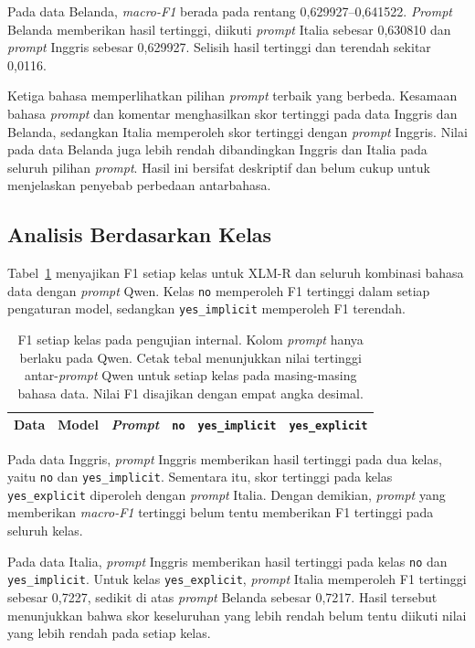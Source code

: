 \documentclass[11pt]{article}
\begin{document}
Pada data Belanda, \textit{macro-F1} berada pada rentang 0,629927--0,641522. \textit{Prompt} Belanda memberikan hasil tertinggi, diikuti \textit{prompt} Italia sebesar 0,630810 dan \textit{prompt} Inggris sebesar 0,629927. Selisih hasil tertinggi dan terendah sekitar 0,0116.

Ketiga bahasa memperlihatkan pilihan \textit{prompt} terbaik yang berbeda. Kesamaan bahasa \textit{prompt} dan komentar menghasilkan skor tertinggi pada data Inggris dan Belanda, sedangkan Italia memperoleh skor tertinggi dengan \textit{prompt} Inggris. Nilai pada data Belanda juga lebih rendah dibandingkan Inggris dan Italia pada seluruh pilihan \textit{prompt}. Hasil ini bersifat deskriptif dan belum cukup untuk menjelaskan penyebab perbedaan antarbahasa.

\subsection{Analisis Berdasarkan Kelas}
Tabel~\ref{tab:classes} menyajikan F1 setiap kelas untuk XLM-R dan seluruh kombinasi bahasa data dengan \textit{prompt} Qwen. Kelas \texttt{no} memperoleh F1 tertinggi dalam setiap pengaturan model, sedangkan \texttt{yes\_implicit} memperoleh F1 terendah.

\begin{table}[t]
\centering
\begin{tabular}{lllrrr}
\toprule
Data & Model & \textit{Prompt} & \texttt{no} & \texttt{yes\_implicit} & \texttt{yes\_explicit} \\
\midrule

\end{tabular}
\caption{F1 setiap kelas pada pengujian internal. Kolom \textit{prompt} hanya berlaku pada Qwen. Cetak tebal menunjukkan nilai tertinggi antar-\textit{prompt} Qwen untuk setiap kelas pada masing-masing bahasa data. Nilai F1 disajikan dengan empat angka desimal.}
\label{tab:classes}
\end{table}

Pada data Inggris, \textit{prompt} Inggris memberikan hasil tertinggi pada dua kelas, yaitu \texttt{no} dan \nolinkurl{yes_implicit}. Sementara itu, skor tertinggi pada kelas \nolinkurl{yes_explicit} diperoleh dengan \textit{prompt} Italia. Dengan demikian, \textit{prompt} yang memberikan \textit{macro-F1} tertinggi belum tentu memberikan F1 tertinggi pada seluruh kelas.

Pada data Italia, \textit{prompt} Inggris memberikan hasil tertinggi pada kelas \texttt{no} dan \nolinkurl{yes_implicit}. Untuk kelas \nolinkurl{yes_explicit}, \textit{prompt} Italia memperoleh F1 tertinggi sebesar 0,7227, sedikit di atas \textit{prompt} Belanda sebesar 0,7217. Hasil tersebut menunjukkan bahwa skor keseluruhan yang lebih rendah belum tentu diikuti nilai yang lebih rendah pada setiap kelas.
\end{document}
